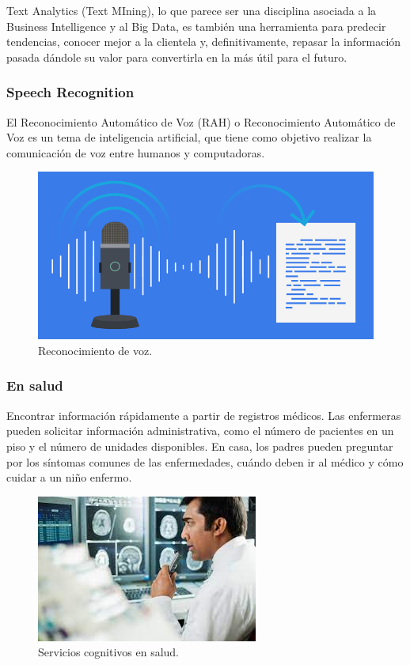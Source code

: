 Text Analytics (Text MIning), lo que parece ser una disciplina asociada a la Business Intelligence y al Big Data, es también una herramienta para predecir tendencias, conocer mejor a la clientela y, definitivamente, repasar la información pasada dándole su valor para convertirla en la más útil para el futuro.

\subsubsection{Speech Recognition}

El Reconocimiento Automático de Voz (RAH) o Reconocimiento Automático de Voz es un tema de inteligencia artificial, que tiene como objetivo realizar la comunicación de voz entre humanos y computadoras.

\begin{figure}[htbp]
\centerline{\includegraphics[width = 0.5 \textwidth]{fig43.png}}
\caption{Reconocimiento de voz.}
\label{fig43}
\end{figure}

\subsubsection{En salud}

Encontrar información rápidamente a partir de registros médicos.
Las enfermeras pueden solicitar información administrativa, como el número de pacientes en un piso y el número de unidades disponibles.
En casa, los padres pueden preguntar por los síntomas comunes de las enfermedades, cuándo deben ir al médico y cómo cuidar a un niño enfermo.

\begin{figure}[htbp]
\centerline{\includegraphics[width = 0.5 \textwidth]{fig38.jpg}}
\caption{Servicios cognitivos en salud.}
\label{fig38}
\end{figure}


